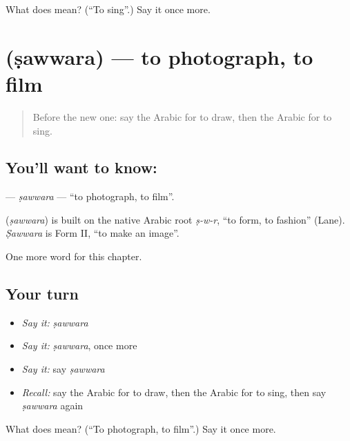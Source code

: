 \begin{tcolorbox}[breakable,colback=teal!4,colframe=teal!35!black,title={Before you move on}]
What does  mean? (\textquotedblleft{}To sing\textquotedblright{}.) Say it once more.
\end{tcolorbox}
\section[\texorpdfstring{\ar{صور} (ṣawwara)}{صور (ṣawwara)}]{ (ṣawwara) — to photograph, to film}

\label{lesson:AR-C228-sawwara}



\begin{quote}
Before the new one: say the Arabic for to draw, then the Arabic for to sing.
\end{quote}

\subsection*{You'll want to know: }
\textbf{} — \emph{ṣawwara} — \textquotedblleft{}to photograph, to film\textquotedblright{}.

\begin{cousinweb}
\textbf{} (\emph{ṣawwara}) is built on the native Arabic root \emph{ṣ-w-r}, \textquotedblleft{}to form, to fashion\textquotedblright{} (Lane). \emph{Ṣawwara} is Form II, \textquotedblleft{}to make an image\textquotedblright{}.
\end{cousinweb}

\begin{grammarlens}[title={What you've built}]
One more word for this chapter.
\end{grammarlens}

\subsection*{Your turn}
\begin{itemize}
\raggedright
  \item \emph{Say it:} \emph{ṣawwara}
  \item \emph{Say it:} \emph{ṣawwara}, once more
  \item \emph{Say it:} say \emph{ṣawwara}
  \item \emph{Recall:} say the Arabic for to draw, then the Arabic for to sing, then say \emph{ṣawwara} again
\end{itemize}

\begin{tcolorbox}[breakable,colback=teal!4,colframe=teal!35!black,title={Before you move on}]
What does  mean? (\textquotedblleft{}To photograph, to film\textquotedblright{}.) Say it once more.
\end{tcolorbox}
